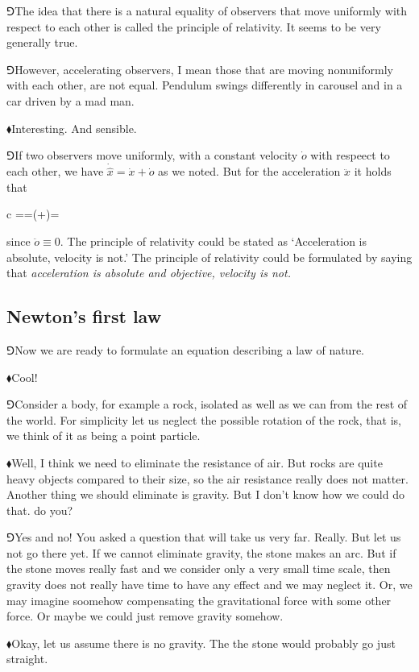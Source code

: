 \documentclass[10pt,oneside%
]{memoir}
\newenvironment{eqna}{\begin{IEEEeqnarray*}{c}}{\end{IEEEeqnarray*}\ignorespacesafterend}
\newcommand{\der}[2]{\frac{\dd#1}{\dd#2}}
\newcommand{\dd}{\mathrm{d}}
\newcommand{\primed}[1]{\hat{#1}}
\newcommand{\hea}{\(\blacklozenge\)\;}
\newcommand{\heb}{\(\Game\)\;}
\begin{document}
\heb The idea that there is a natural equality of observers that move uniformly with respect to each other is called the principle of relativity. It seems to be very generally true.

\heb However, accelerating observers, I mean those that are moving nonuniformly with each other, are not equal. Pendulum swings differently in carousel and in a car driven by a mad man.

\hea Interesting. And sensible.

\heb If two observers move uniformly, with a constant velocity \(\dot{o}\) with respeect to each other, we have \(\dot{\primed{x}}=\dot{x}+\dot{o}\) as we noted. But for the acceleration \(\ddot{x}\) it holds that
\begin{eqna}
    \ddot{\primed{x}}=\der{}{t}\dot{\primed{x}}=\der{}{t}(+)=
\end{eqna}
since \(\ddot{o}\equiv 0\). The principle of relativity could be stated as `Acceleration is absolute, velocity is not.' The principle of relativity could be formulated by saying that \emph{acceleration is absolute and objective, velocity is not.}
\subsection{Newton's first law}
\heb Now we are ready to formulate an equation describing a law of nature.

\hea Cool!

\heb Consider a body, for example a rock, isolated as well as we can from the rest of the world. For simplicity let us neglect the possible rotation of the rock, that is, we think of it as being a point particle.

\hea Well, I think we need to eliminate the resistance of air. But rocks are quite heavy objects compared to their size, so the air resistance really does not matter. Another thing we should eliminate is gravity. But I don't know how we could do that. do you?

\heb Yes and no! You asked a question that will take us very far. Really. But let us not go there yet. If we cannot eliminate gravity, the stone makes an arc. But if the stone moves really fast and we consider only a very small time scale, then gravity does not really have time to have any effect and we may neglect it. Or, we may imagine soomehow compensating the gravitational force with some other force. Or maybe we could just remove gravity somehow.

\hea Okay, let us assume there is no gravity. The the stone would probably go just straight.
\end{document}
